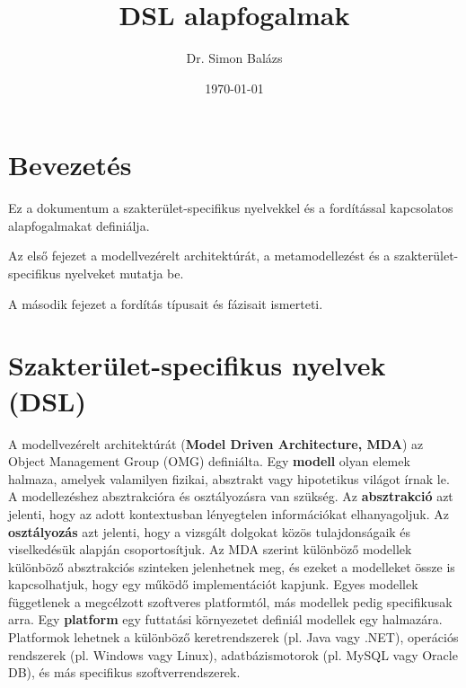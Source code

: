 \documentclass[12pt, a4paper]{report}
\title{DSL alapfogalmak}
\author{Dr. Simon Balázs}
\date{\today}
\newcommand{\bb}[1]{\textbf{#1}}
\begin{document}
\maketitle

\tableofcontents

\chapter{Bevezetés}

Ez a dokumentum a szakterület-specifikus nyelvekkel és a fordítással kapcsolatos alapfogalmakat definiálja.

Az első fejezet a modellvezérelt architektúrát, a metamodellezést és a szakterület-specifikus nyelveket mutatja be.

A második fejezet a fordítás típusait és fázisait ismerteti.


\chapter{Szakterület-specifikus nyelvek (DSL)}

A modellvezérelt architektúrát (\bb{Model Driven Architecture, MDA}) \cite{Mel04} \cite{Fra02} az Object Management Group (OMG) definiálta. Egy \bb{modell} olyan elemek halmaza, amelyek valamilyen fizikai, absztrakt vagy hipotetikus világot írnak le. A modellezéshez absztrakcióra és osztályozásra van szükség. Az \bb{absztrakció} azt jelenti, hogy az adott kontextusban lényegtelen információkat elhanyagoljuk. Az \bb{osztályozás} azt jelenti, hogy a vizsgált dolgokat közös tulajdonságaik és viselkedésük alapján csoportosítjuk. Az MDA szerint különböző modellek különböző absztrakciós szinteken jelenhetnek meg, és ezeket a modelleket össze is kapcsolhatjuk, hogy egy működő implementációt kapjunk. Egyes modellek függetlenek a megcélzott szoftveres platformtól, más modellek pedig specifikusak arra. Egy \bb{platform} egy futtatási környezetet definiál modellek egy halmazára. Platformok lehetnek a különböző keretrendszerek (pl. Java vagy .NET), operációs rendszerek (pl. Windows vagy Linux), adatbázismotorok (pl. MySQL vagy Oracle DB), és más specifikus szoftverrendszerek.
\end{document}
